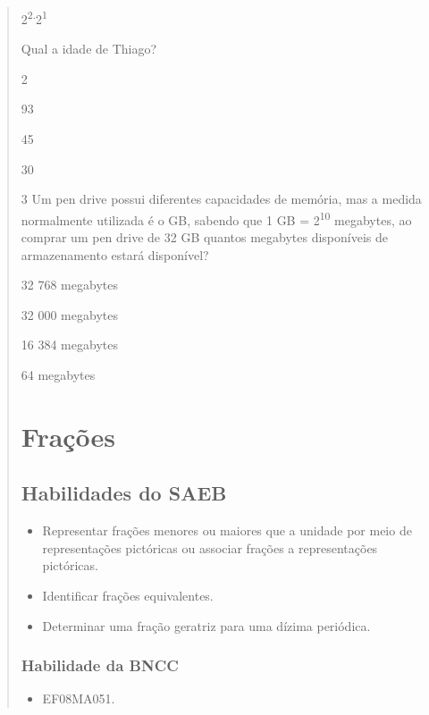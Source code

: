 \begin{quote}
2\textsuperscript{2.}2\textsuperscript{1}

Qual a idade de Thiago?

\begin{escolha} 
\item 2
\item 93
\item 45
\item 30 
\end{escolha}


\num{3}
Um pen drive possui diferentes capacidades de memória, mas a medida
normalmente utilizada é o GB, sabendo que 1 GB = 2\textsuperscript{10}
megabytes, ao comprar um pen drive de 32 GB quantos megabytes
disponíveis de armazenamento estará disponível?

\begin{escolha}
\item 32 768 megabytes 
\item 32 000 megabytes
\item 16 384 megabytes
\item 64 megabytes
\end{escolha}

\chapter{Frações}

\section{Habilidades do SAEB}

\begin{itemize}
\item
  Representar frações menores ou maiores que a unidade por meio de
  representações pictóricas ou associar frações a representações
  pictóricas.
\item
  Identificar frações equivalentes.
\item
  Determinar uma fração geratriz para uma dízima periódica.
\end{itemize}

\subsection{Habilidade da BNCC}

\begin{itemize}
\item EF08MA051.
\end{itemize}


\end{quote}
